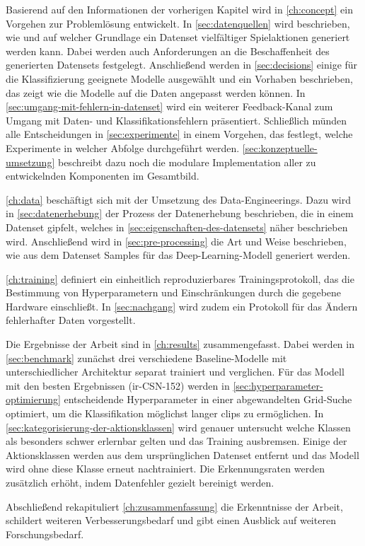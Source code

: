 Basierend auf den Informationen der vorherigen Kapitel wird in \autoref{ch:concept} ein Vorgehen zur Problemlösung entwickelt.
In \autoref{sec:datenquellen} wird beschrieben, wie und auf welcher Grundlage ein Datenset vielfältiger Spielaktionen generiert werden kann.
Dabei werden auch Anforderungen an die Beschaffenheit des generierten Datensets festgelegt.
Anschließend werden in \autoref{sec:decisions} einige für die Klassifizierung geeignete Modelle ausgewählt und ein Vorhaben beschrieben, das zeigt wie die Modelle auf die Daten angepasst werden können.
In \autoref{sec:umgang-mit-fehlern-in-datenset} wird ein weiterer Feedback-Kanal zum Umgang mit Daten- und Klassifikationsfehlern präsentiert.
Schließlich münden alle Entscheidungen in \autoref{sec:experimente} in einem Vorgehen, das festlegt, welche Experimente in welcher Abfolge durchgeführt werden.
\autoref{sec:konzeptuelle-umsetzung} beschreibt dazu noch die modulare Implementation aller zu entwickelnden Komponenten im Gesamtbild.

\autoref{ch:data} beschäftigt sich mit der Umsetzung des Data-Engineerings.
Dazu wird in \autoref{sec:datenerhebung} der Prozess der Datenerhebung beschrieben, die in einem Datenset gipfelt, welches in \autoref{sec:eigenschaften-des-datensets} näher beschrieben wird.
Anschließend wird in \autoref{sec:pre-processing} die Art und Weise beschrieben, wie aus dem Datenset Samples für das Deep-Learning-Modell generiert werden.

\autoref{ch:training} definiert ein einheitlich reproduzierbares Trainingsprotokoll, das die Bestimmung von Hyperparametern und Einschränkungen durch die gegebene Hardware einschließt.
In \autoref{sec:nachgang} wird zudem ein Protokoll für das Ändern fehlerhafter Daten vorgestellt.

Die Ergebnisse der Arbeit sind in \autoref{ch:results} zusammengefasst.
Dabei werden in \autoref{sec:benchmark} zunächst drei verschiedene Baseline-Modelle mit unterschiedlicher Architektur separat trainiert und verglichen.
Für das Modell mit den besten Ergebnissen (ir-CSN-152) werden in \autoref{sec:hyperparameter-optimierung} entscheidende Hyperparameter in einer abgewandelten Grid-Suche optimiert, um die Klassifikation möglichst langer \glspl{clip} zu ermöglichen.
In \autoref{sec:kategorisierung-der-aktionsklassen} wird genauer untersucht welche Klassen als besonders schwer erlernbar gelten und das Training ausbremsen.
Einige der Aktionsklassen werden aus dem ursprünglichen Datenset entfernt und das Modell wird ohne diese Klasse erneut nachtrainiert.
Die Erkennungsraten werden zusätzlich erhöht, indem \zB Datenfehler gezielt bereinigt werden.

Abschließend rekapituliert \autoref{ch:zusammenfassung} die Erkenntnisse der Arbeit, schildert weiteren Verbesserungsbedarf und gibt einen Ausblick auf weiteren Forschungsbedarf.
